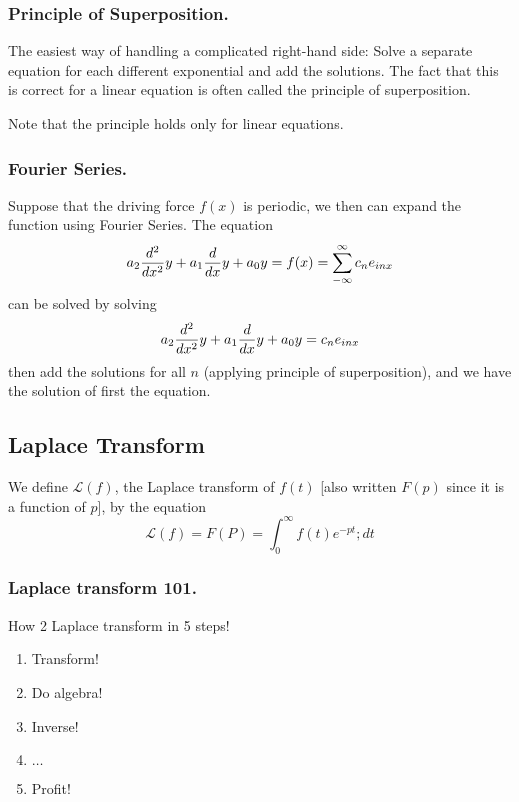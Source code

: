 \documentclass[../../../main.tex]{subfiles}
\begin{document}
\subsubsection{Principle of Superposition.} The easiest way of handling a complicated right-hand side: Solve a separate equation for each different exponential and add the solutions.
The fact that this is correct for a linear equation is often called the principle of superposition.

Note that the principle holds only for linear equations.

\subsubsection{Fourier Series.}
Suppose that the driving force $f(x)$ is periodic, we then can expand the function using Fourier Series.
The equation
\begin{equation*}
    a_2\frac{d^2}{dx^2} y+a_1\frac{d}{dx} y+a_0y=f(x)=\sum_{-\infty}^{\infty}c_ne_{inx}
\end{equation*}
can be solved by solving
\begin{equation*}
    a_2\frac{d^2}{dx^2} y+a_1\frac{d}{dx} y+a_0y=c_ne_{inx}
\end{equation*}
then add the solutions for all $n$ (applying principle of superposition), and we have the solution of first the equation.

\subsection{Laplace Transform}
We define $\mathcal{L}(f )$, the Laplace transform of $f (t)$ [also written $F (p)$ since it is a function of $p$], by the equation
\begin{equation*}
    \mathcal{L}(f)=F(P)=\int_{0}^{\infty}f(t)e^{-pt};dt
\end{equation*}

\subsubsection{Laplace transform 101.} How 2 Laplace transform in 5 steps!
\begin{enumerate}
    \item Transform!
    \item Do algebra!
    \item Inverse!
    \item $\dots$
    \item Profit!
\end{enumerate}
\end{document}
